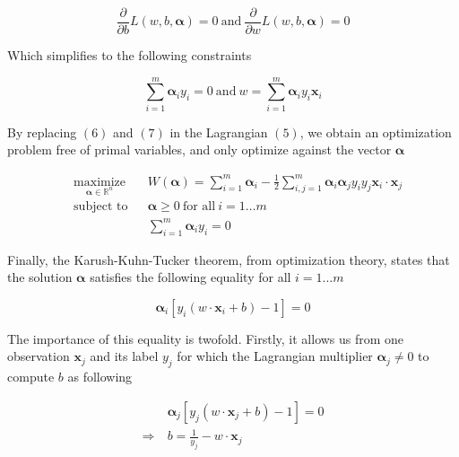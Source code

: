 \begin{equation}
  \frac{\partial}{\partial b}L(w, b, \boldsymbol{\alpha}) = 0
  \ \text{and}\ 
  \frac{\partial}{\partial w}L(w, b, \boldsymbol{\alpha}) = 0
\end{equation}

Which simplifies to the following constraints 

\begin{equation}
  \sum^m_{i=1} \boldsymbol{\alpha}_iy_i = 0
  \ \text{and}\ 
  w = \sum^m_{i=1} \boldsymbol{\alpha}_iy_i\mathbf{x}_i
\end{equation}

By replacing $(6)$ and $(7)$ in the Lagrangian $(5)$, we obtain an optimization problem free of primal variables, and only optimize against the vector $\boldsymbol{\alpha}$

\begin{equation}
  \begin{aligned}
    &\underset{\boldsymbol{\alpha} \in \mathbb{R}^n} {\text{maximize}}
    & & W(\boldsymbol{\alpha}) = \sum_{i=1}^m\boldsymbol{\alpha}_i - \frac{1}{2}\sum_{i,j=1}^m\boldsymbol{\alpha}_i\boldsymbol{\alpha}_jy_iy_j\mathbf{x}_i \cdot \mathbf{x}_j\\
    &\text{subject to}
    & &\boldsymbol{\alpha} \ge 0\ \text{for all}\ i = 1 \dotsc m\\
    & & &\sum^m_{i=1} \boldsymbol{\alpha}_iy_i = 0
  \end{aligned}
\end{equation}

Finally, the Karush-Kuhn-Tucker theorem, from optimization theory, states that the solution $\boldsymbol{\alpha}$ satisfies the following equality for all $i = 1\dotsc m$

\begin{equation}
  \boldsymbol{\alpha}_i[y_i(w \cdot \mathbf{x}_i + b) - 1] = 0
\end{equation}

The importance of this equality is twofold. Firstly, it allows us from one observation $\mathbf{x}_j$ and its label $y_j$ for which the Lagrangian multiplier $\boldsymbol{\alpha}_j \neq 0$ to compute $b$ as following

\begin{equation}
  \begin{aligned}
    &\boldsymbol{\alpha}_j[y_j(w \cdot \mathbf{x}_j + b) - 1] = 0\\
    \Rightarrow\ &b = \frac{1}{y_j} - w \cdot \mathbf{x}_j
  \end{aligned}
\end{equation}

